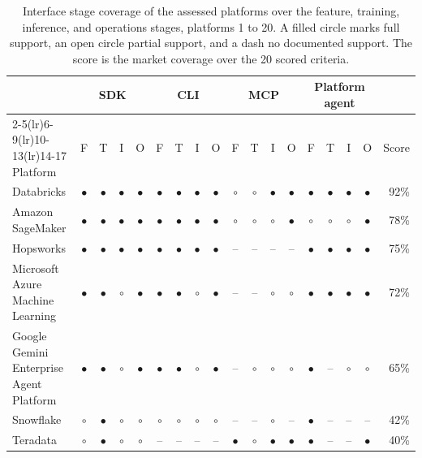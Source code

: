 \begin{landscape}
\begin{table}[p]\centering
\caption[Complete market assessment, interface stage coverage, platforms 1 to 20]{Interface stage coverage of the assessed platforms over the feature, training, inference, and operations stages, platforms 1 to 20. A filled circle marks full support, an open circle partial support, and a dash no documented support. The score is the market coverage over the 20 scored criteria.}
\label{tab:market-coverage-full}
{\scriptsize\setlength{\tabcolsep}{4pt}
\begin{tabular}{l cccc cccc cccc cccc r}
\toprule
 & \multicolumn{4}{c}{\gls{SDK}} & \multicolumn{4}{c}{\gls{CLI}} & \multicolumn{4}{c}{\gls{MCP}} & \multicolumn{4}{c}{Platform agent} & \\
\cmidrule(lr){2-5}\cmidrule(lr){6-9}\cmidrule(lr){10-13}\cmidrule(lr){14-17}
Platform & F & T & I & O & F & T & I & O & F & T & I & O & F & T & I & O & Score \\
\midrule
Databricks & $\bullet$ & $\bullet$ & $\bullet$ & $\bullet$ & $\bullet$ & $\bullet$ & $\bullet$ & $\bullet$ & $\circ$ & $\circ$ & $\bullet$ & $\bullet$ & $\bullet$ & $\bullet$ & $\bullet$ & $\bullet$ & 92\% \\
Amazon SageMaker & $\bullet$ & $\bullet$ & $\bullet$ & $\bullet$ & $\bullet$ & $\bullet$ & $\bullet$ & $\bullet$ & $\circ$ & $\circ$ & $\circ$ & $\bullet$ & $\circ$ & $\circ$ & $\circ$ & $\bullet$ & 78\% \\
Hopsworks & $\bullet$ & $\bullet$ & $\bullet$ & $\bullet$ & $\bullet$ & $\bullet$ & $\bullet$ & $\bullet$ & -- & -- & -- & -- & $\bullet$ & $\bullet$ & $\bullet$ & $\bullet$ & 75\% \\
Microsoft Azure Machine Learning & $\bullet$ & $\bullet$ & $\circ$ & $\bullet$ & $\bullet$ & $\bullet$ & $\circ$ & $\bullet$ & -- & -- & $\circ$ & $\circ$ & $\bullet$ & $\bullet$ & $\bullet$ & $\bullet$ & 72\% \\
Google Gemini Enterprise Agent Platform & $\bullet$ & $\bullet$ & $\circ$ & $\bullet$ & $\bullet$ & $\bullet$ & $\circ$ & $\bullet$ & -- & $\circ$ & $\circ$ & $\circ$ & $\bullet$ & -- & $\circ$ & $\circ$ & 65\% \\
Snowflake & $\circ$ & $\bullet$ & $\circ$ & $\circ$ & $\circ$ & $\circ$ & $\circ$ & $\circ$ & -- & -- & $\circ$ & -- & $\bullet$ & -- & -- & -- & 42\% \\
Teradata & $\circ$ & $\bullet$ & $\circ$ & $\circ$ & -- & -- & -- & -- & $\bullet$ & $\circ$ & $\bullet$ & $\bullet$ & $\bullet$ & -- & -- & $\bullet$ & 40\% \\

\end{tabular}}
\end{table}
\end{landscape}
